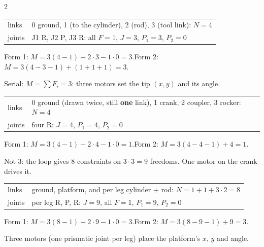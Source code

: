 \begin{multicols}{2}
\begin{worked}[RPR, $D=3$ planar]
\begin{tabular}{@{}ll@{}}
links & 0 ground, 1 (to the cylinder), 2 (rod), 3 (tool link): $N=4$\\
joints & J1 R, J2 P, J3 R: all $F=1$, $J=3$, $P_1=3$, $P_2=0$
\end{tabular}\par
Form 1: $M=3(4-1)-2\cdot3-1\cdot0=3$.\quad Form 2: $M=3(4-3-1)+(1+1+1)=3$. \chk\par
Serial: $M=\sum F_i=3$: three motors set the tip $(x,y)$ and its angle.
\end{worked}
\columnbreak
{}
\begin{worked}[four-bar, $D=3$]
\begin{tabular}{@{}ll@{}}
links & 0 ground (drawn twice, still \textbf{one} link), 1 crank, 2 coupler, 3 rocker: $N=4$\\
joints & four R: $J=4$, $P_1=4$, $P_2=0$
\end{tabular}\par
Form 1: $M=3(4-1)-2\cdot4-1\cdot0=1$.\quad Form 2: $M=3(4-4-1)+4=1$. \chk\par
Not 3: the loop gives 8 constraints on $3\cdot3=9$ freedoms. One motor on the crank drives it.
\end{worked}
\begin{worked}[3-RPR, $D=3$]
\begin{tabular}{@{}ll@{}}
links & ground, platform, and per leg cylinder + rod: $N=1+1+3\cdot2=8$\\
joints & per leg R, P, R: $J=9$, all $F=1$, $P_1=9$, $P_2=0$
\end{tabular}\par
Form 1: $M=3(8-1)-2\cdot9-1\cdot0=3$.\quad Form 2: $M=3(8-9-1)+9=3$. \chk\par
Three motors (one prismatic joint per leg) place the platform's $x$, $y$ and angle.
\end{worked}


\end{multicols}
